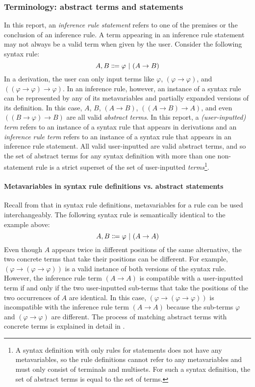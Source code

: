 \subsubsection{Terminology: abstract terms and statements}
In this report, an \textit{inference rule statement} refers to one of the premises or the conclusion of an inference rule. A term appearing in an inference rule statement may not always be a valid term when given by the user. Consider the following syntax rule:
\[
    A, B \Coloneqq \varphi \ |\  (A \to B)
\]
In a derivation, the user can only input terms like $\varphi$, $(\varphi \to \varphi)$, and $((\varphi \to \varphi) \to \varphi)$. In an inference rule, however, an instance of a syntax rule can be represented by any of its metavariables and partially expanded versions of its definition. In this case, $A$, $B$, $(A \to B)$, $((A \to B) \to A)$, and even $((B \to \varphi) \to B)$ are all valid \textit{abstract terms}. In this report, a \textit{(user-inputted) term} refers to an instance of a syntax rule that appears in derivations and an \textit{inference rule term} refers to an instance of a syntax rule that appears in an inference rule statement. All valid user-inputted are valid abstract terms, and so the set of abstract terms for any syntax definition with more than one non-statement rule is a strict superset of the set of user-inputted \textit{terms}\footnote{A syntax definition with only rules for statements does not have any metavariables, so the rule definitions cannot refer to any metavariables and must only consist of terminals and multisets. For such a syntax definition, the set of abstract terms is equal to the set of terms.}.

\paragraph{Metavariables in syntax rule definitions vs. abstract statements}
Recall from  that in syntax rule definitions, metavariables for a rule can be used interchangeably. The following syntax rule is semantically identical to the example above:
\[
    A, B \Coloneqq \varphi \ |\  (A \to A)
\]
Even though $A$ appears twice in different positions of the same alternative, the two concrete terms that take their positions can be different. For example, $(\varphi \to (\varphi \to \varphi))$ is a valid instance of both versions of the syntax rule. However, the inference rule term $(A \to A)$ is compatible with a user-inputted term if and only if the two user-inputted sub-terms that take the positions of the two occurrences of $A$ are identical. In this case, $(\varphi \to (\varphi \to \varphi))$ is incompatible with the inference rule term $(A \to A)$ because the sub-terms $\varphi$ and $(\varphi \to \varphi)$ are different. The process of matching abstract terms with concrete terms is explained in detail in .

